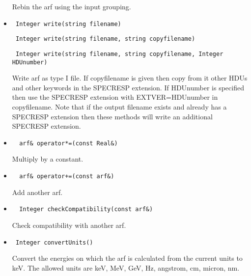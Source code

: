 \documentclass[11pt]{book}
\begin{document}
\begin{itemize}
           Rebin the arf using the input grouping.

\item  \begin{verbatim} Integer write(string filename) \end{verbatim}
       \begin{verbatim} Integer write(string filename, string copyfilename) \end{verbatim}
       \begin{verbatim} Integer write(string filename, string copyfilename, Integer HDUnumber) \end{verbatim}

          Write arf as type I file. If copyfilename is given then
          copy from it other HDUs and other keywords in the SPECRESP
          extension. If HDUnumber is specified then use the SPECRESP
          extension with EXTVER=HDUnumber in copyfilename. Note that 
          if the output filename exists and already has a SPECRESP 
          extension then these methods will write an
          additional SPECRESP extension.

\item  \begin{verbatim}  arf& operator*=(const Real&) \end{verbatim}

          Multiply by a constant.

\item  \begin{verbatim}  arf& operator+=(const arf&) \end{verbatim}

          Add another arf.

\item  \begin{verbatim}  Integer checkCompatibility(const arf&) \end{verbatim}

          Check compatibility with another arf.

\item  \begin{verbatim} Integer convertUnits() \end{verbatim}

          Convert the energies on which the arf is calculated from the
          current units to keV. The allowed units are keV, MeV, GeV, Hz,
          angstrom, cm, micron, nm.

\end{itemize}
\end{document}
